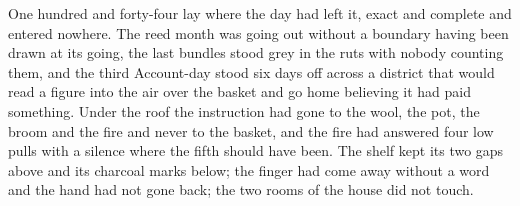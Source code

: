 One hundred and forty-four lay where the day had left it, exact and complete and entered nowhere. The reed month was going out without a boundary having been drawn at its going, the last bundles stood grey in the ruts with nobody counting them, and the third Account-day stood six days off across a district that would read a figure into the air over the basket and go home believing it had paid something. Under the roof the instruction had gone to the wool, the pot, the broom and the fire and never to the basket, and the fire had answered four low pulls with a silence where the fifth should have been. The shelf kept its two gaps above and its charcoal marks below; the finger had come away without a word and the hand had not gone back; the two rooms of the house did not touch.

